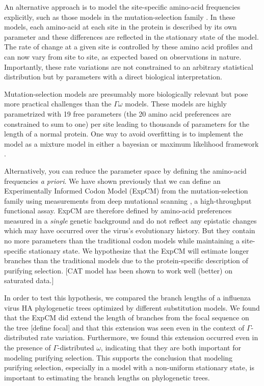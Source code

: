 \documentclass[11pt]{article}
\newcommand\skhcomment[1]{{\color{cyan}[#1]}}
\begin{document}
An alternative approach is to model the site-specific amino-acid frequencies explicitly, such as those models in the mutation-selection family \citep{halpern1998evolutionary}. 
In these models, each amino-acid at each site in the protein is described by its own parameter and these differences are reflected in the stationary state of the model. 
The rate of change at a given site is controlled by these amino acid profiles and can now vary from site to site, as expected based on observations in nature. 
Importantly, these rate variations are not constrained to an arbitrary statistical distribution but by parameters with a direct biological interpretation. 

Mutation-selection models are presumably more biologically relevant but pose more practical challenges than the $\Gamma\omega$ models. 
These models are highly parametrized with 19 free parameters (the 20 amino acid preferences are constrained to sum to one) per site leading to thousands of parameters for the length of a normal protein. 
One way to avoid overfitting is to implement the model as a mixture model in either a bayesian \citep{lartillot2004bayesian} or maximum likelihood framework \citep{si2008empirical}. 

Alternatively, you can reduce the parameter space by defining the amino-acid frequencies \textit{a priori}. 
We have shown previously that we can define an Experimentally Informed Codon Model (ExpCM) \citep{bloom2014experimentally,bloom2014informed} from the mutation-selection family using measurements from deep mutational scanning \citep{fowler2014deep}, a high-throughput functional assay. 
ExpCM are therefore defined by amino-acid preferences measured in a \textit{single} genetic background and do not reflect any epistatic changes which may have occurred over the virus's evolutionary history. 
But they contain no more parameters than the traditional codon models while maintaining a site-specific stationary state. 
We hypothesize that the ExpCM will estimate longer branches than the traditional models due to the protein-specific description of purifying selection. 
\skhcomment{CAT model has been shown to work well (better) on saturated data.}

In order to test this hypothesis, we compared the branch lengths of a influenza virus HA phylogenetic trees optimized by different substitution models. 
We found that the ExpCM did extend the length of branches from the focal sequence on the tree \skhcomment{define focal} and that this extension was seen even in the context of $\Gamma$-distributed rate variation. 
Furthermore, we found this extension occurred even in the presence of $\Gamma$-distributed $\omega$, indicating that they are both important for modeling purifying selection. 
This supports the conclusion that modeling purifying selection, especially in a model with a non-uniform stationary state, is important to estimating the branch lengths on phylogenetic trees. 
\end{document}
